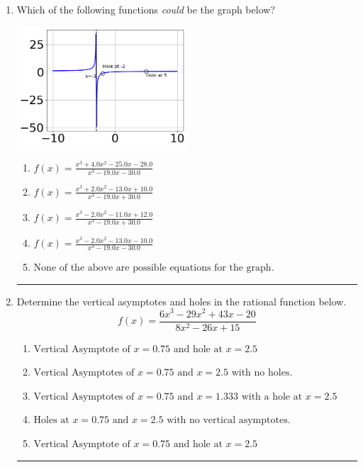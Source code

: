 \documentclass[14pt]{extbook}
\newcommand{\litem}[1]{\item#1\hspace*{-1cm}\rule{\textwidth}{0.4pt}}
\begin{document}
\begin{enumerate}
{\begin{enumerate}[label=\Alph*.]
\end{enumerate} }
\litem{
Which of the following functions \textit{could} be the graph below?
\begin{center}
    \includegraphics[width=0.5\textwidth]{../Figures/identifyGraphOfRationalFunctionA.png}
\end{center}
\begin{enumerate}[label=\Alph*.]
\item \( f(x)=\frac{x^{3} +4.0 x^{2} -25.0 x -28.0}{x^{3} -19.0 x -30.0} \)
\item \( f(x)=\frac{x^{3} +2.0 x^{2} -13.0 x + 10.0}{x^{3} -19.0 x + 30.0} \)
\item \( f(x)=\frac{x^{3} -2.0 x^{2} -11.0 x + 12.0}{x^{3} -19.0 x + 30.0} \)
\item \( f(x)=\frac{x^{3} -2.0 x^{2} -13.0 x -10.0}{x^{3} -19.0 x -30.0} \)
\item \( \text{None of the above are possible equations for the graph.} \)

\end{enumerate} }
\litem{
Determine the vertical asymptotes and holes in the rational function below.\[ f(x) = \frac{6x^{3} -29 x^{2} +43 x -20}{8x^{2} -26 x + 15} \]\begin{enumerate}[label=\Alph*.]
\item \( \text{Vertical Asymptote of } x = 0.75 \text{ and hole at } x = 2.5 \)
\item \( \text{Vertical Asymptotes of } x = 0.75 \text{ and } x = 2.5 \text{ with no holes.} \)
\item \( \text{Vertical Asymptotes of } x = 0.75 \text{ and } x = 1.333 \text{ with a hole at } x = 2.5 \)
\item \( \text{Holes at } x = 0.75 \text{ and } x = 2.5 \text{ with no vertical asymptotes.} \)
\item \( \text{Vertical Asymptote of } x = 0.75 \text{ and hole at } x = 2.5 \)

\end{enumerate} }
\end{enumerate}
\end{document}

